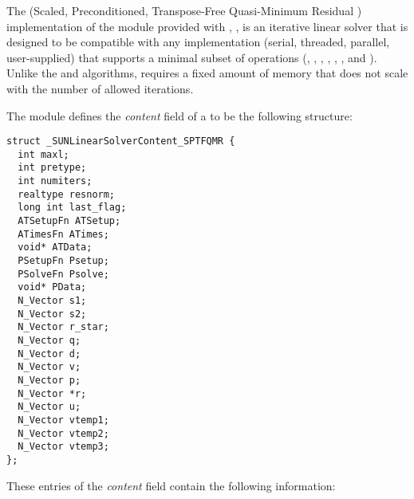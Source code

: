 
The {\sptfqmr} (Scaled, Preconditioned, Transpose-Free Quasi-Minimum
Residual \cite{Fre:93}) implementation of the {\sunlinsol} module 
provided with {\sundials}, {\sunlinsolsptfqmr}, is an iterative linear
solver that is designed to be compatible with any {\nvector}
implementation (serial, threaded, parallel, user-supplied) that
supports a minimal subset of operations (, 
, , , ,
,  and ).  Unlike the
{\spgmr} and {\spfgmr} algorithms, {\spbcg} requires a fixed amount of
memory that does not scale with the number of allowed iterations.

The {\sunlinsolsptfqmr} module defines the {\em content} field of a
 to be the following structure:
\begin{verbatim} 
struct _SUNLinearSolverContent_SPTFQMR {
  int maxl;
  int pretype;
  int numiters;
  realtype resnorm;
  long int last_flag;
  ATSetupFn ATSetup;
  ATimesFn ATimes;
  void* ATData;
  PSetupFn Psetup;
  PSolveFn Psolve;
  void* PData;
  N_Vector s1;
  N_Vector s2;
  N_Vector r_star;
  N_Vector q;
  N_Vector d;
  N_Vector v;
  N_Vector p;
  N_Vector *r;
  N_Vector u;
  N_Vector vtemp1;
  N_Vector vtemp2;
  N_Vector vtemp3;
};
\end{verbatim}
These entries of the \emph{content} field contain the following
information:
